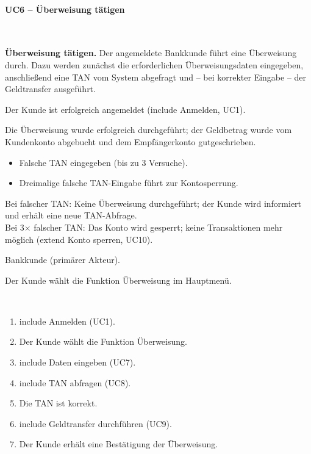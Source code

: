 \documentclass[12pt]{scrartcl}
\newcommand{\umark}[1]{\guillemotleft #1\guillemotright}
\begin{document}
    \paragraph{UC6 -- \"Uberweisung t\"atigen}~\\[4pt]
    \begin{description}[leftmargin=4.5cm, style=nextline, font=\normalfont\bfseries]
  \item[Name und Kurzbeschreibung:]
  \textbf{\"Uberweisung t\"atigen.}
  Der angemeldete Bankkunde f\"uhrt eine \"Uberweisung durch. Dazu werden
  zun\"achst die erforderlichen \"Uberweisungsdaten eingegeben, anschlie{\ss}end
  eine TAN vom System abgefragt und -- bei korrekter Eingabe -- der
  Geldtransfer ausgef\"uhrt.

  \item[Vorbedingung:]
  Der Kunde ist erfolgreich angemeldet (\umark{include} Anmelden, UC1).

  \item[Nachbedingung:]
  Die \"Uberweisung wurde erfolgreich durchgef\"uhrt; der Geldbetrag wurde
  vom Kundenkonto abgebucht und dem Empf\"angerkonto gutgeschrieben.

  \item[Fehlersituationen:]
  \begin{itemize}[nosep]
      \item Falsche TAN eingegeben (bis zu 3 Versuche).
      \item Dreimalige falsche TAN-Eingabe f\"uhrt zur Kontosperrung.
  \end{itemize}

  \item[Systemzustand im Fehlerfall:]
  Bei falscher TAN: Keine \"Uberweisung durchgef\"uhrt; der Kunde wird
  informiert und erh\"alt eine neue TAN-Abfrage.\\
  Bei 3$\times$ falscher TAN: Das Konto wird gesperrt; keine Transaktionen
  mehr m\"oglich (\umark{extend} Konto sperren, UC10).

  \item[Akteure:]
  Bankkunde (prim\"arer Akteur).

  \item[Trigger:]
  Der Kunde w\"ahlt die Funktion \glqq \"Uberweisung\grqq{} im Hauptmen\"u.

  \item[Standardablauf:]~
  \begin{enumerate}
      \item \umark{include} Anmelden (UC1).
      \item Der Kunde w\"ahlt die Funktion \glqq \"Uberweisung\grqq.
      \item \umark{include} Daten eingeben (UC7).
      \item \umark{include} TAN abfragen (UC8).
      \item Die TAN ist korrekt.
      \item \umark{include} Geldtransfer durchf\"uhren (UC9).
      \item Der Kunde erh\"alt eine Best\"atigung der \"Uberweisung.
  \end{enumerate}


\end{description}
\end{document}
